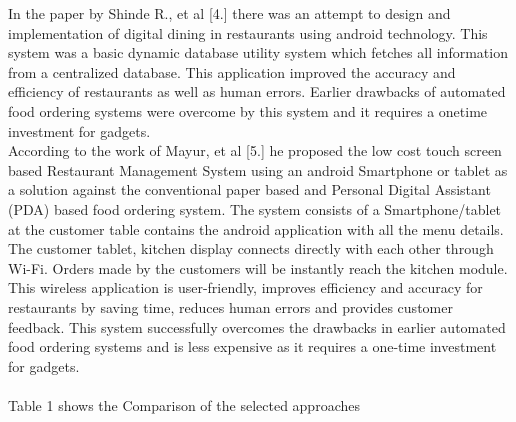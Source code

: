 \documentclass[english]{article}
\begin{document}
In the paper by Shinde R., et al [4.] there was an attempt to design and implementation
of digital dining in restaurants using android technology.
This system was a basic dynamic database utility system
which fetches all information from a centralized database.
This application improved the accuracy and efficiency of
restaurants as well as human errors. Earlier drawbacks of
automated food ordering systems were overcome by this
system and it requires a onetime investment for gadgets.\\


 According to the work of Mayur, et al [5.] he
proposed the low cost touch screen based Restaurant
Management System using an android Smartphone or tablet as a
solution against the conventional paper based and Personal
Digital Assistant (PDA) based food ordering system. The system
consists of a Smartphone/tablet at the customer table contains the
android application with all the menu details. The customer
tablet, kitchen display connects directly with each other through
Wi-Fi. Orders made by the customers will be instantly reach the
kitchen module. This wireless application is user-friendly,
improves efficiency and accuracy for restaurants by saving time,
reduces human errors and provides customer feedback. This
system successfully overcomes the drawbacks in earlier
automated food ordering systems and is less expensive as it
requires a one-time investment for gadgets. \\ \\ Table 1 shows the Comparison of the selected approaches
\end{document}

